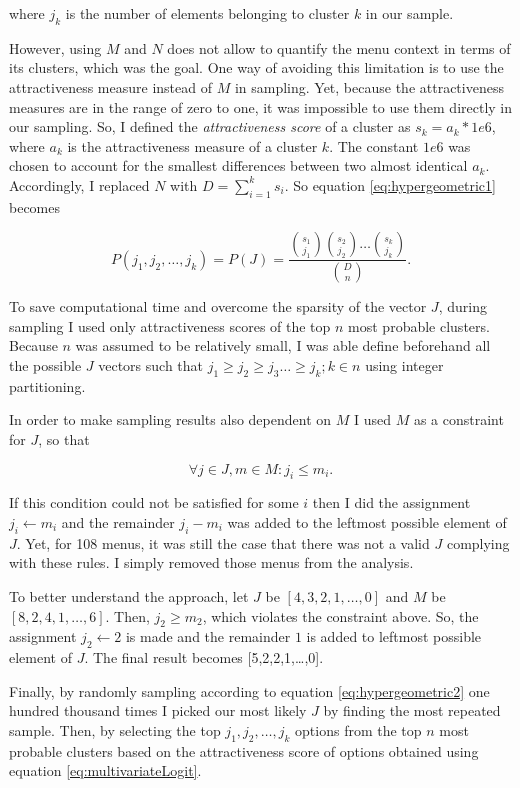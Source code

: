 \documentclass[a4paper,12pt]{article}
\begin{document}
where $j_k$ is the number of elements belonging to cluster $k$ in our sample. 
 
However, using $M$ and $N$ does not allow to quantify the menu context in terms of its clusters, which was the goal. One way of avoiding this limitation is to use the attractiveness measure instead of $M$ in sampling. Yet, because the attractiveness measures are in the range of zero to one, it was impossible to use them directly in our sampling. So, I defined the \textit{attractiveness score} of a cluster as $s_k = a_k \ast 1e6$, where $a_k$ is the attractiveness measure of a cluster $k$. The constant $1e6$ was chosen to account for the smallest differences between two almost identical $a_k$. Accordingly, I replaced $N$ with $D=\sum_{i=1}^{k}s_i$. So equation \ref{eq:hypergeometric1} becomes

\begin{equation}\label{eq:hypergeometric2}
    P(j_1, j_2,\ldots, j_k) = P(J) =\frac{{s_1\choose j_1} {s_2\choose j_2} \dots {s_k\choose j_k}}{{D\choose n}}.
\end{equation}

To save computational time and overcome the sparsity of the vector $J$, during sampling I used only attractiveness scores of the top $n$ most probable clusters. Because $n$ was assumed to be relatively small, I was able define beforehand all the possible $J$ vectors such that $j_1\geq j_2\geq j_3\ldots\geq j_k; k \in n$ using integer partitioning.

In order to make sampling results also dependent on $M$ I used $M$ as a constraint for $J$, so that 

$$ \forall j \in J,m \in M: j_i\le m_i.$$

If this condition could not be satisfied for some $i$ then I did the assignment ${j_i\gets m_i}$ and the remainder $j_i-m_i$ was added to the leftmost possible element of $J$.  Yet, for 108 menus, it was still the case that there was not a valid $J$ complying with these rules. I simply removed those menus from the analysis. 

To better understand the approach, let $J$ be $[4, 3, 2, 1,\ldots,0]$ and $M$ be $[8, 2, 4, 1,\dots, 6]$. Then, $j_2\geq m_2$, which violates the constraint above. So, the assignment $j_2\gets2$ is made and the remainder $1$ is added to leftmost possible element of $J$. The final result becomes [5,2,2,1,\ldots,0].

Finally, by randomly sampling according to equation \ref{eq:hypergeometric2} one hundred thousand times I picked our most likely $J$ by finding the most repeated sample. Then, by selecting the top $j_1, j_2, \dots, j_k$ options from the top $n$ most probable clusters based on the attractiveness score of options obtained using equation \ref{eq:multivariateLogit}.
\end{document}
